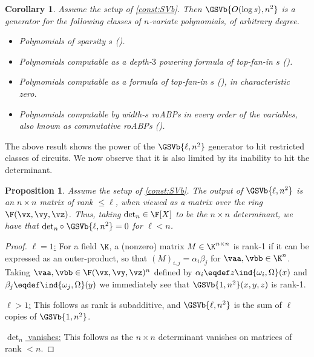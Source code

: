 \documentclass[11pt]{article}
\numberwithin{equation}{section}
\newtheorem{proposition}[theorem]{Proposition}
\newtheorem{corollary}[theorem]{Corollary}
\theoremstyle{definition}
\theoremstyle{plain}
\begin{document}
\begin{corollary}\label{res:SVb-gen}
        Assume the setup of \autoref{const:SVb}. Then $\GSVb{O(\log s),n^2}$ is a generator for the following classes of $n$-variate polynomials, of arbitrary degree.
        \begin{itemize}
                \item Polynomials of sparsity $s$ (\cite{ShpilkaVolkovich09,GurjarKST15,Forbes15}).
                \item Polynomials computable as a depth-$3$ powering formula of top-fan-in $s$ (\cite{AgrawalSS13,ForbesShpilka13a}).
                \item Polynomials computable as a \sumpowc formula of top-fan-in $s$ (\cite{Forbes15}), in characteristic zero.
                \item Polynomials computable by width-$s$ roABPs in every order of the variables, also known as commutative roABPs (\cite{AgrawalSS13,ForbesSS14}).
        \end{itemize}
\end{corollary}

The above result shows the power of the $\GSVb{\ell,n^2}$ generator to hit restricted classes of circuits.  We now observe that it is also limited by its inability to hit the determinant.

\begin{proposition}
        Assume the setup of \autoref{const:SVb}.  The output of $\GSVb{\ell,n^2}$ is an $n\times n$ matrix of rank $\le \ell$, when viewed as a matrix over the ring $\F(\vx,\vy,\vz)$.  Thus, taking $\det_n\in\F[X]$ to be the $n\times n$ determinant, we have that $\det_n\circ \;\GSVb{\ell,n^2}=0$ for $\ell<n$.
\end{proposition}
\begin{proof}
        \uline{$\ell=1$:} For a field $\K$, a (nonzero) matrix $M\in \K^{n\times n}$ is rank-1 if it can be expressed as an outer-product, so that $(M)_{i,j}=\alpha_i\beta_j$ for $\vaa,\vbb\in \K^n$.  Taking $\vaa,\vbb\in\F(\vx,\vy,\vz)^n$ defined by $\alpha_i\eqdef z\ind{\omega_i,\Omega}(x)$ and $\beta_j\eqdef\ind{\omega_j,\Omega}(y)$ we immediately see that $\GSVb{1,n^2}(x,y,z)$ is rank-1.

        \uline{$\ell>1$:} This follows as rank is subadditive, and $\GSVb{\ell,n^2}$ is the sum of $\ell$ copies of $\GSVb{1,n^2}$.

        \uline{$\det_n$ vanishes:} This follows as the $n\times n$ determinant vanishes on matrices of rank $<n$.
\end{proof}
\end{document}
